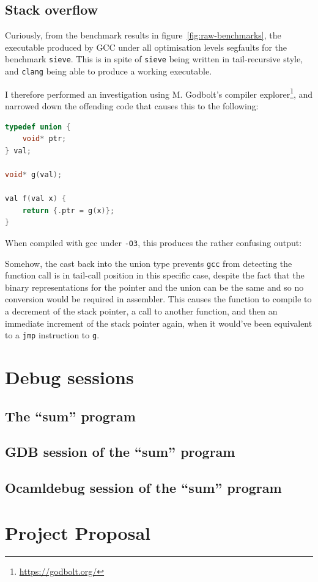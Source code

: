 \section{Stack overflow} \label{stack-overflow}

Curiously, from the benchmark results in figure~\ref{fig:raw-benchmarks}, the
executable produced by GCC under all optimisation levels segfaults for the
benchmark \texttt{sieve}. This is in spite of \texttt{sieve} being written in
tail-recursive style, and \texttt{clang} being able to produce a working
executable.

I therefore performed an investigation using M. Godbolt's compiler
explorer\footnote{\url{https://godbolt.org/}}, and narrowed down the offending
code that causes this to the following: 

\begin{lstlisting}[language=C]
typedef union {
    void* ptr;
} val;

void* g(val);

val f(val x) {
    return {.ptr = g(x)};
}
\end{lstlisting}

When compiled with gcc under \texttt{-O3}, this produces the rather confusing
output:



Somehow, the cast back into the union type prevents \texttt{gcc} from detecting 
the function call is in tail-call position in this specific case, despite the 
fact that the binary representations for the pointer and the union can be the
same and so no conversion would be required in assembler. This causes the
function to compile to a decrement of the stack pointer, a call to another
function, and then an immediate increment of the stack pointer again, when it
would've been equivalent to a \texttt{jmp} instruction to \texttt{g}.


\chapter{Debug sessions} \label{debug-sessions}

\section{The ``sum'' program}



\section{GDB session of the ``sum'' program} \label{debug-gdb}



\section{Ocamldebug session of the ``sum'' program} \label{debug-ocaml}



\chapter{Project Proposal}


